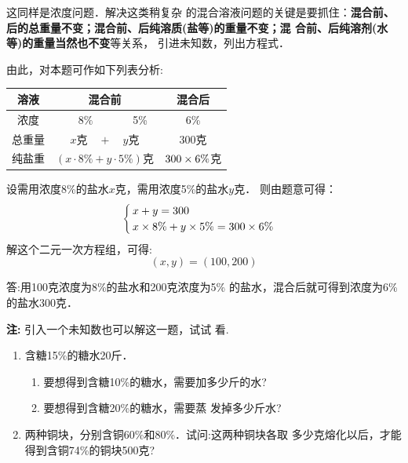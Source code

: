 \begin{analyze}
这同样是浓度问题．解决这类稍复杂
的混合溶液问题的关键是要抓住：\textbf{混合前、后的总重量不变；混合前、后纯溶质(盐等)的重量不变；混
合前、后纯溶剂(水等)的重量当然也不变}等关系，
引进未知数，列出方程式．

    由此，对本题可作如下列表分析:
\begin{center}
\begin{tabular}{|c|c|c|c|}
\hline
溶液  & \multicolumn{2}{c|}{混合前} &混合后\\
\hline
浓度 & $\quad8\%\quad$  & 5\% & 6\%\\
\hline
总重量& \multicolumn{2}{c|}{$x\text{克}\quad +\quad y\text{克}$} &300克\\
\hline
纯盐重  & \multicolumn{2}{c|}{$(x\cdot 8\%+y\cdot 5\%)\text{克}$} &$300\times 6\%$克\\
\hline
\end{tabular}
\end{center}
 \end{analyze}


\begin{solution}
设需用浓度8\%的盐水$x$克，需用浓度5\%的盐水$y$克．
    则由题意可得：
\[\begin{cases}
    x+y=300\\
    x\times 8\% +y\times 5\%=300\times 6\%
\end{cases}\]
    解这个二元一次方程组，可得:
           \[(x,y)=(100,200) \]

    答:用100克浓度为8\%的盐水和200克浓度为5\%
的盐水，混合后就可得到浓度为6\%的盐水300克．

\textbf{注:} 引入一个未知数也可以解这一题，试试
看.
    
\end{solution}

\begin{ex}
\begin{enumerate}
    \item 含糖15\%的糖水20斤．
    \begin{enumerate}
        \item 要想得到含糖10\%的糖水，需要加多少斤的水?
        \item 要想得到含糖20\%的糖水，需要蒸
发掉多少斤水?
    \end{enumerate} 
\item 两种铜块，分别含铜60\%和80\%．试问:这两种铜块各取
多少克熔化以后，才能得到含铜74\%的铜块500克?
\end{enumerate}
 \end{ex}



